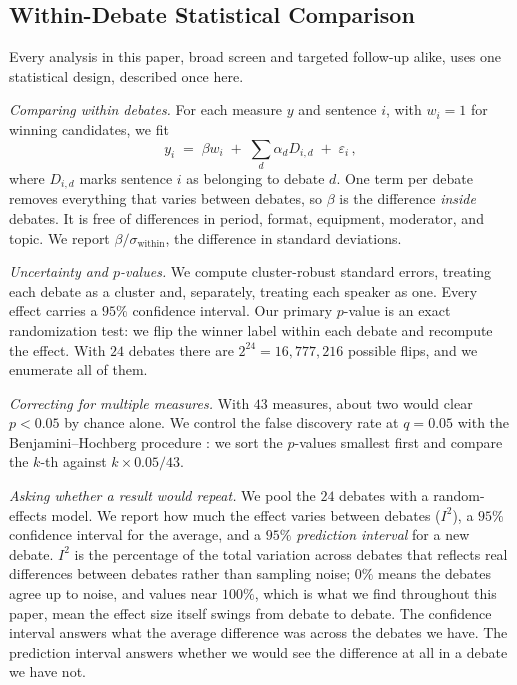 \documentclass[pdflatex,sn-mathphys-num]{sn-jnl}%
\begin{document}
\subsection{Within-Debate Statistical Comparison}
\label{sec:method:fe}

Every analysis in this paper, broad screen and targeted follow-up alike,
uses one statistical design, described once here.

\emph{Comparing within debates.} For each measure $y$ and sentence $i$, with
$w_i = 1$ for winning candidates, we fit
\begin{equation}
y_i \;=\; \beta w_i \;+\; \sum_{d} \alpha_d D_{i,d} \;+\; \varepsilon_i \,,
\label{eq:fe}
\end{equation}
where $D_{i,d}$ marks sentence $i$ as belonging to debate $d$. One term per
debate removes everything that varies between debates, so $\beta$ is the
difference \emph{inside} debates. It is free of differences in period,
format, equipment, moderator, and topic. We report $\beta/\sigma_{\text{within}}$, the
difference in standard deviations.

\emph{Uncertainty and $p$-values.} We compute cluster-robust standard
errors, treating each debate as a cluster and, separately, treating each
speaker as one. Every effect carries a $95\%$ confidence interval. Our
primary $p$-value is an exact randomization test: we flip the winner label
within each debate and recompute the effect. With $24$ debates there are
$2^{24} = 16{,}777{,}216$ possible flips, and we enumerate all of them.

\emph{Correcting for multiple measures.} With $43$ measures, about two would
clear $p < 0.05$ by chance alone. We control the false discovery rate at
$q = 0.05$ with the Benjamini--Hochberg procedure
\cite{benjamini1995controlling}: we sort the $p$-values smallest first and
compare the $k$-th against $k \times 0.05/43$.

\emph{Asking whether a result would repeat.} We pool the $24$ debates with a
random-effects model. We report how much the effect varies between debates
($I^2$), a $95\%$ confidence interval for the average, and a $95\%$
\emph{prediction interval} for a new debate. $I^2$ is the percentage of the
total variation across debates that reflects real differences between
debates rather than sampling noise; $0\%$ means the debates agree up to
noise, and values near $100\%$, which is what we find throughout this
paper, mean the effect size itself swings from debate to debate. The
confidence interval answers what the average difference was across the
debates we have. The prediction interval answers whether we would see the
difference at all in a debate we have not.
\end{document}
